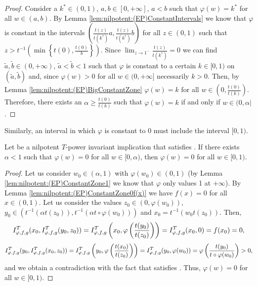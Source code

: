 \begin{proof}
	Consider a $k^* \in (0,1)$, $a,b \in [0,+\infty]$, $a<b$ such that $\varphi(w)=k^*$ for all $w \in (a,b)$. By Lemma \ref{lem:nilpotent:(EP)ConstantIntervals} we know that $\varphi$ is constant in the intervals $\left(\frac{t(z)}{t(k^*)}a,\frac{t(z)}{t(k^*)}b\right)$ for all $z \in (0,1)$ such that $z>t^{-1}\left(\min \left \{ t(0),\frac{t(0)}{b} \right\}\right)$. Since $\displaystyle \lim_{z \to 1^-} \frac{t(z)}{t(k^*)} = 0$ we can find $\tilde{a},\tilde{b} \in (0,+\infty)$, $\tilde{a}<\tilde{b}<1$ such that $\varphi$ is constant to a certain $k \in [0,1)$ on $(\tilde{a},\tilde{b})$ and, since $\varphi(w)>0$ for all $w \in (0,+\infty]$ necessarily $k>0$. Then, by Lemma \ref{lem:nilpotent:(EP)BigConstantZone} $\varphi(w)=k$ for all $w \in \left(0,\frac{t(0)}{t(k)}\right)$. Therefore, there exists an $\alpha \geq \frac{t(0)}{t(k)}$ such that $\varphi(w)=k$ if and only if $w \in (0,\alpha|$.
\end{proof}
Similarly, an interval in which $\varphi$ is constant to 0 must include the interval $[0,1)$.
\begin{lemma}\label{lem:nilpotent:(EP)ConstantZone0}
	Let \IT be a nilpotent $T$-power invariant implication that satisfies \EP. If there exists $\alpha<1$ such that $\varphi(w)=0$ for all $w \in [0,\alpha)$, then $\varphi(w)=0$ for all $w \in [0,1)$.
\end{lemma}
\begin{proof}
	Let us consider $w_0 \in (\alpha,1)$ with $\varphi(w_0) \in (0,1)$ (by Lemma \ref{lem:nilpotent:(EP)ConstantZone1} we know that $\varphi$ only values 1 at $+\infty$). By Lemma \ref{lem:nilpotent:(EP)ConstantZone0f(x)} we have $f(x)=0$ for all $x \in (0,1)$. Let us consider the values $z_0 \in (0,\varphi(w_0))$, $y_0 \in (t^{-1}(\alpha t(z_0)), t^{-1}(\alpha t \circ \varphi(w_0)))$ and $x_0=t^{-1}(w_0t(z_0))$. Then,
	$$I^T_{\varphi,f,g}(x_0,I^T_{\varphi,f,g}(y_0,z_0)) = I^T_{\varphi,f,g} \left(x_0,\varphi \left(\frac{t(y_0)}{t(z_0)}\right)\right) = I^T_{\varphi,f,g}(x_0,0)=f(x_0)=0,$$
	$$I^T_{\varphi,f,g}(y_0,I^T_{\varphi,f,g}(x_0,z_0)) = I^T_{\varphi,f,g} \left(y_0,\varphi \left(\frac{t(x_0)}{t(z_0)}\right)\right) = I^T_{\varphi,f,g}(y_0,\varphi(w_0)) = \varphi \left(\frac{t(y_0)}{t \circ \varphi(w_0)}\right)>0,$$
	and we obtain a contradiction with the fact that \IT satisfies \EP. Thus, $\varphi(w)=0$ for all $w \in [0,1)$.
\end{proof}

